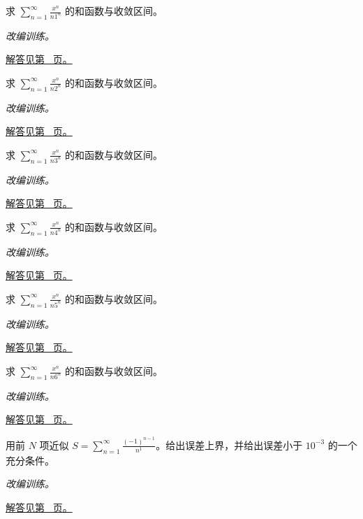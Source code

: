 \documentclass[UTF8,12pt,a4paper,fontset=fandol]{ctexart}
\begin{document}
\begin{example}[对数和函数与端点]\label{ex:c26q14}
求 $\displaystyle\sum_{n=1}^\infty\frac{x^n}{n1^n}$ 的和函数与收敛区间。
\par\textit{改编训练。}\par\hyperref[ans:c26q14]{解答见第~\pageref{ans:c26q14} 页。}
\end{example}
\begin{example}[对数和函数与端点]\label{ex:c26q15}
求 $\displaystyle\sum_{n=1}^\infty\frac{x^n}{n2^n}$ 的和函数与收敛区间。
\par\textit{改编训练。}\par\hyperref[ans:c26q15]{解答见第~\pageref{ans:c26q15} 页。}
\end{example}
\begin{example}[对数和函数与端点]\label{ex:c26q16}
求 $\displaystyle\sum_{n=1}^\infty\frac{x^n}{n3^n}$ 的和函数与收敛区间。
\par\textit{改编训练。}\par\hyperref[ans:c26q16]{解答见第~\pageref{ans:c26q16} 页。}
\end{example}
\begin{example}[对数和函数与端点]\label{ex:c26q17}
求 $\displaystyle\sum_{n=1}^\infty\frac{x^n}{n4^n}$ 的和函数与收敛区间。
\par\textit{改编训练。}\par\hyperref[ans:c26q17]{解答见第~\pageref{ans:c26q17} 页。}
\end{example}
\begin{example}[对数和函数与端点]\label{ex:c26q18}
求 $\displaystyle\sum_{n=1}^\infty\frac{x^n}{n5^n}$ 的和函数与收敛区间。
\par\textit{改编训练。}\par\hyperref[ans:c26q18]{解答见第~\pageref{ans:c26q18} 页。}
\end{example}
\begin{example}[对数和函数与端点]\label{ex:c26q19}
求 $\displaystyle\sum_{n=1}^\infty\frac{x^n}{n6^n}$ 的和函数与收敛区间。
\par\textit{改编训练。}\par\hyperref[ans:c26q19]{解答见第~\pageref{ans:c26q19} 页。}
\end{example}
\begin{example}[交错级数的误差控制]\label{ex:c26q20}
用前 $N$ 项近似 $\displaystyle S=\sum_{n=1}^\infty\frac{(-1)^{n-1}}{n^{1}}$。给出误差上界，并给出误差小于 $10^{-3}$ 的一个充分条件。
\par\textit{改编训练。}\par\hyperref[ans:c26q20]{解答见第~\pageref{ans:c26q20} 页。}
\end{example}
\end{document}
